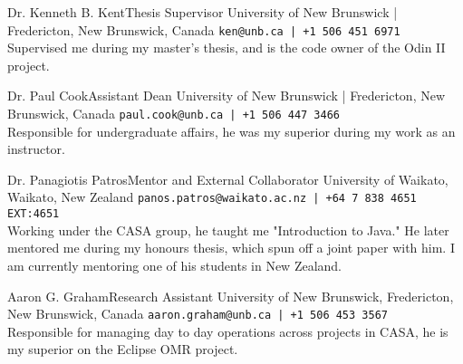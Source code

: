 \documentclass[9.5pt]{developercv} %
\begin{document}
\begin{entrylist}

    \entry%
        {Dr. Kenneth B. Kent}{Thesis Supervisor}
        {University of New Brunswick | Fredericton, New Brunswick, Canada}
        {\texttt{ken@unb.ca | +1 506 451 6971}\\
            Supervised me during my master's thesis, and is the code owner of the Odin II project.
            }

    \entry%
        {Dr. Paul Cook}{Assistant Dean}
        {University of New Brunswick | Fredericton, New Brunswick, Canada}
        {\texttt{paul.cook@unb.ca | +1 506 447 3466}\\
            Responsible for undergraduate affairs, he was my superior during my work as an instructor.
            }


    \entry%
        {Dr. Panagiotis Patros}{Mentor and External Collaborator}
        {University of Waikato, Waikato, New Zealand}
        {\texttt{panos.patros@waikato.ac.nz | +64 7 838 4651 EXT:4651}\\
            Working under the CASA group, he taught me "Introduction to Java."
            He later mentored me during my honours thesis, which spun off a joint paper with him.
            I am currently mentoring one of his students in New Zealand.
            }

    \entry%
        {Aaron G. Graham}{Research Assistant}
        {University of New Brunswick, Fredericton, New Brunswick, Canada}
        {\texttt{aaron.graham@unb.ca | +1 506 453 3567}\\
            Responsible for managing day to day operations across projects in CASA, he is my superior on the Eclipse OMR project.
            }

\end{entrylist}
\end{document}

